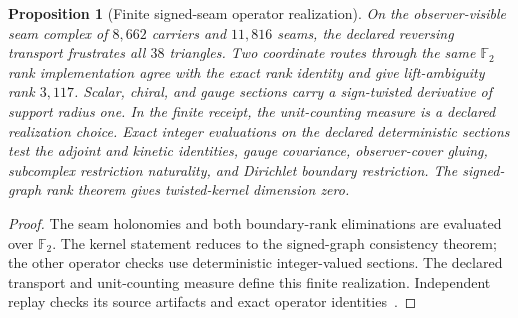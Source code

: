 \documentclass[11pt]{article}
\newtheorem{proposition}[theorem]{Proposition}
\theoremstyle{remark}
\theoremstyle{plain}
\begin{document}
\begin{proposition}[Finite signed-seam operator realization]
\label{prop:finite-source-inhabitation}
On the observer-visible seam complex of \(8{,}662\) carriers and \(11{,}816\)
seams, the declared reversing transport frustrates all \(38\) triangles. Two
coordinate routes through the same \(\mathbb F_2\) rank implementation agree
with the exact rank identity and give lift-ambiguity rank \(3{,}117\).
Scalar, chiral, and gauge sections carry a sign-twisted
derivative of support radius one. In the finite receipt, the unit-counting
measure is a declared realization choice.
Exact integer evaluations on the declared deterministic sections test the
adjoint and kinetic identities, gauge covariance, observer-cover gluing,
subcomplex restriction naturality, and Dirichlet boundary restriction. The
signed-graph rank theorem gives twisted-kernel dimension zero.

\end{proposition}

\begin{proof}
The seam holonomies and both boundary-rank eliminations are evaluated over
\(\mathbb F_2\). The kernel statement reduces to the signed-graph consistency
theorem; the other operator checks use deterministic integer-valued sections.
The declared transport and unit-counting measure define this finite
realization. Independent replay checks its source artifacts and exact
operator identities~\cite{ophfpe}.
\end{proof}
\end{document}
